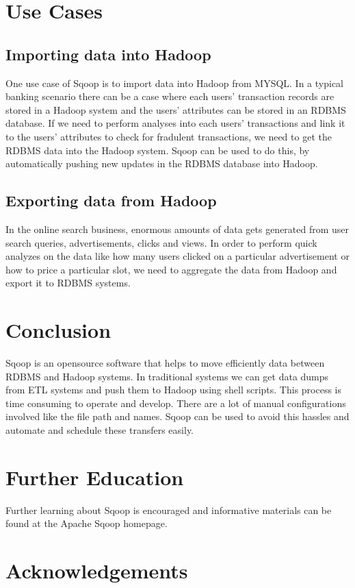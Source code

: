 \documentclass[9pt,twocolumn,twoside]{styles/osajnl}
\begin{document}
\section{Use Cases}
\subsection{Importing data into Hadoop}
One use case of Sqoop is to import data into Hadoop from MYSQL. In a typical banking scenario there can be a case where each users' transaction records are stored in a Hadoop system and the users' attributes can be stored in an RDBMS database. If we need to perform analyses into each users' transactions and link it to the users' attributes to check for fradulent transactions, we need to get the RDBMS data into the Hadoop system. Sqoop can be used to do this, by automatically pushing new updates in the RDBMS database into Hadoop. 

\subsection{Exporting data from Hadoop}
In the online search business, enormous amounts of data gets generated from user search queries, advertisements, clicks and views. In order to perform quick analyzes on the data like how many users clicked on a particular advertisement or how to price a particular slot, we need to aggregate the data from Hadoop and export it to RDBMS systems. 

\section{Conclusion}
Sqoop is an opensource software that helps to move efficiently data between RDBMS and Hadoop systems. In traditional systems we can get data dumps from ETL systems and push them to Hadoop using shell scripts. This process is time consuming to operate and develop. There are a lot of manual configurations involved like the file path and names. Sqoop can be used to avoid this hassles and automate and schedule these transfers easily. 

\section{Further Education}
Further learning about Sqoop is encouraged and informative materials can be found at the Apache Sqoop homepage\cite{pages}.

\section*{Acknowledgements}
\end{document}
